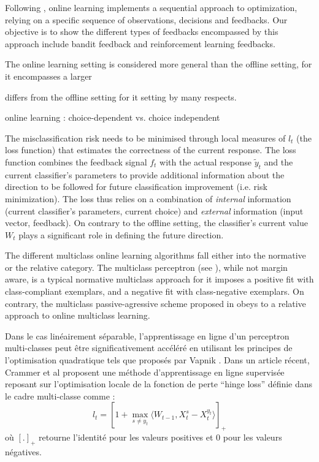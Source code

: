 \documentclass[preprint,12pt,authoryear]{elsarticle}
\begin{document}
Following \cite{crammer2006online}, online learning implements a sequential approach to optimization, relying on a specific sequence of observations, decisions and feedbacks.
Our objective is to show the different types of feedbacks encompassed by this approach include bandit feedback and  reinforcement learning feedbacks. 
 


The online learning setting is considered more general than the offline setting, for it encompasses a larger 



differs from the offline setting for it  setting by many respects.  


online learning : choice-dependent vs. choice independent

The misclassification risk needs to be minimised through local measures of $l_t$  (the loss function) that estimates the correctness of the current response. The loss function combines the feedback signal $f_t$ with the actual response $\tilde{y}_t$ and the current classifier's parameters to provide additional information about the direction to be followed for future classification improvement (i.e. risk minimization). 
The loss thus relies on a combination of \emph{internal} information (current classifier's parameters, current choice) and \emph{external} information (input vector, feedback). On contrary to the offline setting, the classifier's current value $W_t$ plays a significant role in defining the future direction. 

The different multiclass online learning algorithms fall either into the normative or the relative category. The multiclass perceptron (see  \cite{freund1999large}), while not margin aware, is a typical normative multiclass approach for it  imposes a positive fit with class-compliant exemplars, and a negative fit with class-negative exemplars.  
On contrary, the multiclass passive-agressive scheme proposed in \cite{crammer2006online} obeys to a relative approach to online multiclass learning.   



Dans le cas linéairement séparable, l'apprentissage en ligne d'un perceptron multi-classes peut être significativement accéléré en utilisant les principes de l'optimisation quadratique tels que proposés par Vapnik \cite{vapnik1998statistical}. Dans un article récent, Crammer et al \cite{crammer2006online} proposent une méthode d'apprentissage en ligne supervisée reposant sur l'optimisation locale de la fonction de perte ``hinge loss'' définie dans le cadre multi-classe comme : 
$$
l_t =[1 + \max_{s \neq y_t}\langle W_{t-1}, X_t^s- X_t^{y_t}\rangle]_+ 
$$
où $[.]_+$ retourne l'identité pour les valeurs positives et 0 pour les valeurs négatives. 
\end{document}
